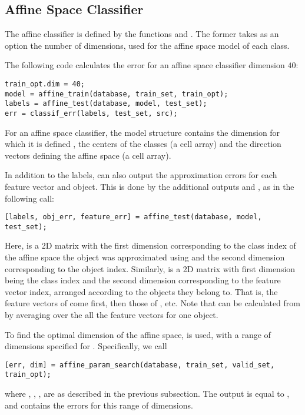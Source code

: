 \documentclass[twocolumn]{article}
\begin{document}
\subsection{Affine Space Classifier}

The affine classifier is defined by the functions  and . The former takes as an option the number of dimensions,  used for the affine space model of each class. 

The following code calculates the error for an affine space classifier dimension $40$:
\begin{lstlisting}
train_opt.dim = 40;
model = affine_train(database, train_set, train_opt);
labels = affine_test(database, model, test_set);
err = classif_err(labels, test_set, src);
\end{lstlisting}

For an affine space classifier, the model structure contains the dimension for which it is defined , the centers of the classes  (a cell array) and the direction vectors defining the affine space  (a cell array).

In addition to the labels,  can also output the approximation errors for each feature vector and object. This is done by the additional outputs  and , as in the following call:
\begin{lstlisting}
[labels, obj_err, feature_err] = affine_test(database, model, test_set);
\end{lstlisting}
Here,  is a 2D matrix with the first dimension corresponding to the class index of the affine space the object was approximated using and the second dimension corresponding to the object index. Similarly,  is a 2D matrix with first dimension being the class index and the second dimension corresponding to the feature vector index, arranged according to the objects they belong to. That is, the feature vectors of  come first, then those of , etc. Note that  can be calculated from  by averaging over the all the feature vectors for one object.

To find the optimal dimension of the affine space,  is used, with a range of dimensions specified for . Specifically, we call
\begin{lstlisting}
[err, dim] = affine_param_search(database, train_set, valid_set, train_opt);
\end{lstlisting}
where , , ,  are as described in the previous subsection. The output  is equal to , and  contains the errors for this range of dimensions.
\end{document}

